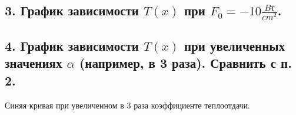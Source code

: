 \documentclass[a4paper,oneside,12pt]{extreport}
\begin{document}



\subsection{3. График зависимости $T(x)$ при $F_{0} = -10 \frac{Bт}{cm^2}$. }


\begin{figure}[ht!]
\end{figure}

\newpage

\subsection{4. График зависимости $T(x)$ при увеличенных значениях $\alpha$ (например, в 3 раза). Сравнить с п. 2.}

Синяя кривая при увеличенном в 3 раза коэффициенте теплоотдачи.
\begin{figure}[ht!]
\end{figure}
\end{document}
